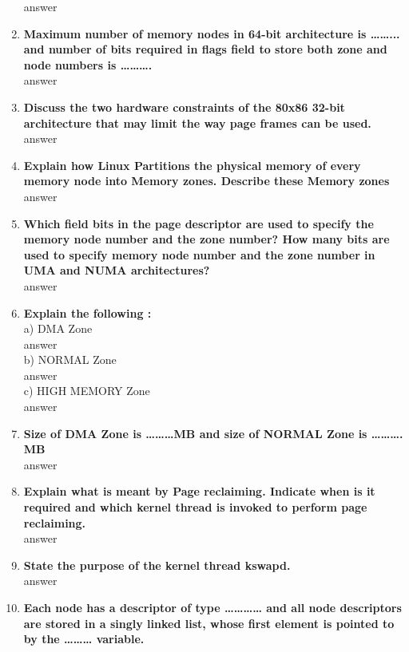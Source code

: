 \documentclass[a4paper,12pt]{article}
\begin{document}
\begin{flushleft}
\begin{enumerate}
{\color{red}answer}\\
\item \textbf{  Maximum number of memory nodes in 64-bit architecture is ……... and number of bits required in flags field to store both zone and node numbers is ……….}\\
{\color{red}answer}\\
\item \textbf{  Discuss the two hardware constraints of the 80x86 32-bit architecture that may limit the way page frames can be used.}\\
{\color{red}answer}\\
\item \textbf{  Explain how Linux Partitions the physical memory of every memory node into Memory zones. Describe these Memory zones}\\
{\color{red}answer}\\
\item \textbf{  Which field bits in the page descriptor are used to specify the memory node number and the zone number? How many bits are used to specify memory node number and the zone number in UMA and NUMA architectures?}\\
{\color{red}answer}\\
\item \textbf{  Explain the following :}\\
a) DMA Zone \\{\color{red}answer}\\
b) NORMAL Zone \\{\color{red}answer}\\
c) HIGH MEMORY Zone\\{\color{red}answer}\\
\item \textbf{  Size of DMA Zone is ………MB and size of NORMAL Zone is ………. MB}\\
{\color{red}answer}\\
\item \textbf{  Explain what is meant by Page reclaiming. Indicate when is it required and which kernel thread is invoked to perform page reclaiming.}\\
{\color{red}answer}\\
\item \textbf{  State the purpose of the kernel thread kswapd.}\\
{\color{red}answer}\\
\item \textbf{  Each node has a descriptor of type ………… and all node descriptors are stored in a singly linked list, whose first element is pointed to by the ……… variable.}\\

\end{enumerate}
\end{flushleft}
\end{document}

